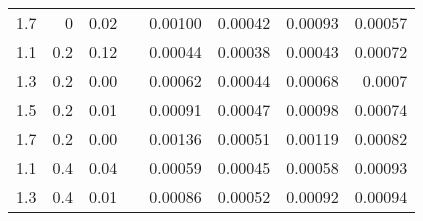 \begin{table*}[tb]
\begin{center}
\begin{tabular}{rrrrrrrr}
1.7 & 0 & 0.02 &  & 0.00100 & 0.00042 & 0.00093 & 0.00057 \\ 
1.1 & 0.2 & 0.12 &  & 0.00044 & 0.00038 & 0.00043 & 0.00072 \\ 
1.3 & 0.2 & 0.00 &  & 0.00062 & 0.00044 & 0.00068 & 0.0007 \\ 
1.5 & 0.2 & 0.01 &  & 0.00091 & 0.00047 & 0.00098 & 0.00074 \\ 
1.7 & 0.2 & 0.00 &  & 0.00136 & 0.00051 & 0.00119 & 0.00082 \\ 
1.1 & 0.4 & 0.04 &  & 0.00059 & 0.00045 & 0.00058 & 0.00093 \\ 
1.3 & 0.4 & 0.01 &  & 0.00086 & 0.00052 & 0.00092 & 0.00094 \\ \hline
\end{tabular}
\label{tab:obsdata}
\end{center}
\end{table*}
